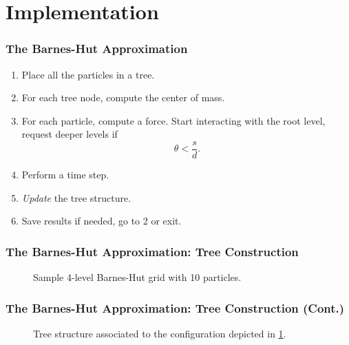 \section{Implementation}

\begin{frame}
	\frametitle{The Barnes-Hut Approximation}
	\begin{enumerate}
		\item Place all the particles in a tree.
		\item For each tree node, compute the center of mass.
		\item For each particle, compute a force. Start interacting with the root level, request deeper levels if
		$$\theta<\frac{s}{d}.$$
		\item Perform a time step.
		\item \emph{Update} the tree structure.
		\item Save results if needed, go to 2 or exit.
	\end{enumerate}
\end{frame}

\begin{frame}
	\frametitle{The Barnes-Hut Approximation: Tree Construction}
	\begin{figure}
		\centering
		\begin{tikzpicture}[scale=0.05,%
		every circle node/.style = {width=3,fill=black}]
		
		\end{tikzpicture}
		\caption{Sample 4-level Barnes-Hut grid with 10 particles.}
		\label{fig:bh-grid}
	\end{figure}
\end{frame}

\begin{frame}
	\frametitle{The Barnes-Hut Approximation: Tree Construction (Cont.)}
	\begin{figure}
		\centering
		\newlength{\lvld}
		\setlength{\lvld}{7em}
		\begin{tikzpicture}[level distance=3em,
		sibling distance=3em,
		level 1/.style={sibling distance=0.80\lvld},
		level 2/.style={sibling distance=0.40\lvld},
		level 3/.style={sibling distance=0.4\lvld},
		level 4/.style={sibling distance=0.25\lvld},
		every node/.style = {shape=circle, draw, align=center, color=black,
			fill=white, scale=0.75}]
		
		\end{tikzpicture}
		\caption{Tree structure associated to the configuration depicted in \cref{fig:bh-grid}.}
		\label{fig:bh-tree}
	\end{figure}
\end{frame}

